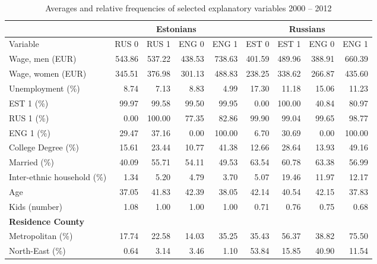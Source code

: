 \documentclass[12pt, a4paper]{article}
\begin{document}
\begin{table}
	\centering
	\caption{Averages and relative frequencies of selected explanatory
		variables 2000 -- 2012}
	\begin{tabular}{l|rrrr|rrrr}
		\toprule
		&  \multicolumn{4}{c|}{Estonians}   &   \multicolumn{4}{c}{Russians}    \\ \midrule
		Variable                    & RUS 0  & RUS 1  & ENG 0  & ENG 1  & EST 0  & EST 1  & ENG 0  & ENG 1  \\ \midrule
		Wage, men (EUR)             & 543.86 & 537.22 & 438.53 & 738.63 & 401.59 & 489.96 & 388.91 & 660.39 \\
		Wage, women (EUR)           & 345.51 & 376.98 & 301.13 & 488.83 & 238.25 & 338.62 & 266.87 & 435.60 \\
		Unemployment (\%)           & 8.74   & 7.13   & 8.83   & 4.99   & 17.30  & 11.18  & 15.06  & 11.23  \\
		EST 1 (\%)                  & 99.97  & 99.58  & 99.50  & 99.95  & 0.00   & 100.00 & 40.84  & 80.97  \\
		RUS 1 (\%)                  & 0.00   & 100.00 & 77.35  & 82.86  & 99.90  & 99.04  & 99.65  & 98.77  \\
		ENG 1 (\%)                  & 29.47  & 37.16  & 0.00   & 100.00 & 6.70   & 30.69  & 0.00   & 100.00 \\
		College Degree (\%)         & 15.61  & 23.44  & 10.77  & 41.38  & 12.66  & 28.64  & 13.93  & 49.16  \\
		Married (\%)                & 40.09  & 55.71  & 54.11  & 49.53  & 63.54  & 60.78  & 63.38  & 56.99  \\
		Inter-ethnic household (\%) & 1.34   & 5.20   & 4.79   & 3.70   & 5.07   & 19.46  & 11.97  & 12.17  \\
		Age                         & 37.05  & 41.83  & 42.39  & 38.05  & 42.14  & 40.54  & 42.15  & 37.83  \\
		Kids (number)               & 1.08   & 1.00   & 1.00   & 1.00   & 0.71   & 0.76   & 0.75   & 0.68   \\
		\textbf{Residence County }  &        &        &        &        &        &        &        &        \\
		Metropolitan (\%)           & 17.74  & 22.58  & 14.03  & 35.25  & 35.43  & 56.37  & 38.82  & 75.50  \\
		North-East (\%)             & 0.64   & 3.14   & 3.46   & 1.10   & 53.84  & 15.85  & 40.90  & 11.54  \\

\end{tabular}
\end{table}
\end{document}
